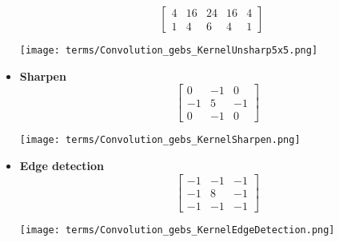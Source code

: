 \begin{itemize}
$$\begin{bmatrix}
    4 & 16 & 24 & 16 & 4 \\
    1 & 4 & 6 & 4 & 1
    \end{bmatrix}
    $$
    \begin{center}
	\texttt{[image: terms/Convolution\_gebs\_KernelUnsharp5x5.png]}
    \end{center}
    \item \textbf{Sharpen}
    $$
    \quad
    \begin{bmatrix} 
    0 & -1 & 0 \\
    -1 & 5 & -1 \\
    0 & -1 & 0
    \end{bmatrix}
    $$
    \begin{center}
	\texttt{[image: terms/Convolution\_gebs\_KernelSharpen.png]}
    \end{center}
    \item \textbf{Edge detection}
    $$
    \quad
    \begin{bmatrix} 
    -1 & -1 & -1 \\
    -1 & 8 & -1 \\
    -1 & -1 & -1
    \end{bmatrix}
    $$
    \begin{center}
	\texttt{[image: terms/Convolution\_gebs\_KernelEdgeDetection.png]}
    \end{center}
\end{itemize}
